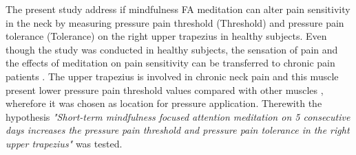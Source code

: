 The present study address if mindfulness FA meditation can alter pain sensitivity in the neck by measuring pressure pain threshold (Threshold) and pressure pain tolerance (Tolerance) on the right upper trapezius in healthy subjects. Even though the study was conducted in healthy subjects, the sensation of pain and the effects of meditation on pain sensitivity can be transferred to chronic pain patients \cite{Kjogx2016}. The upper trapezius is involved in chronic neck pain and this muscle present lower pressure pain threshold values compared with other muscles \cite{Fischer1987, Falla2004}, wherefore it was chosen as location for pressure application.
Therewith the hypothesis \textit{"Short-term mindfulness focused attention meditation on 5 consecutive days increases the pressure pain threshold and pressure pain tolerance in the right upper trapezius"} was tested.

